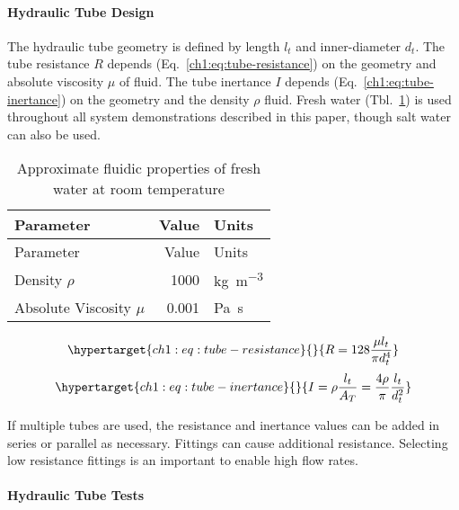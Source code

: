 \hypertarget{ch1:hydraulic-tube-design}{%
\paragraph{Hydraulic Tube Design}\label{ch1:hydraulic-tube-design}}

The hydraulic tube geometry is defined by length \(l_t\) and
inner-diameter \(d_t\). The tube resistance \(R\) depends
(Eq.~\ref{ch1:eq:tube-resistance}) on the geometry and absolute viscosity
\(\mu\) of fluid. The tube inertance \(I\) depends
(Eq.~\ref{ch1:eq:tube-inertance}) on the geometry and the density \(\rho\)
fluid. Fresh water (Tbl.~\ref{ch1:tbl:fluidic-properties}) is used
throughout all system demonstrations described in this paper, though
salt water can also be used.


\hypertarget{ch1:tbl:fluidic-properties}{}
\begin{longtable}[]{@{}lrl@{}}
\caption{\label{ch1:tbl:fluidic-properties}Approximate fluidic properties of
fresh water at room temperature}\tabularnewline
\toprule\noalign{}
Parameter & Value & Units \\
\midrule\noalign{}
\endfirsthead
\toprule\noalign{}
Parameter & Value & Units \\
\midrule\noalign{}
\endhead
\bottomrule\noalign{}
\endlastfoot
Density \(\rho\) & 1000 & \si{\kilogram\per\meter\cubed} \\
Absolute Viscosity \(\mu\) & 0.001 & \si{\pascal\second} \\
\end{longtable}

\begin{equation}\protect\hypertarget{ch1:eq:tube-resistance}{}{ R = 128 \frac{\mu l_t}{\pi d_t^4}   
}\label{ch1:eq:tube-resistance}\end{equation}
\begin{equation}\protect\hypertarget{ch1:eq:tube-inertance}{}{ I = \rho \frac{l_t}{A_T} = \frac{4 \rho}{\pi} \frac{l_t}{d_t^2}   
}\label{ch1:eq:tube-inertance}\end{equation}

If multiple tubes are used, the resistance and inertance values can be
added in series or parallel as necessary. Fittings can cause additional
resistance. Selecting low resistance fittings is an important to enable
high flow rates.

\hypertarget{ch1:hydraulic-tube-tests}{%
\paragraph{Hydraulic Tube Tests}\label{ch1:hydraulic-tube-tests}}

